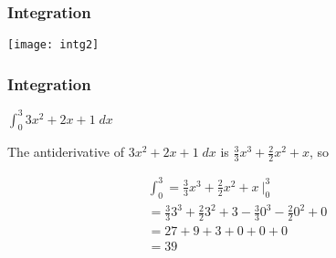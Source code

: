  \begin{frame}[fragile] \frametitle{Integration}

\begin{center}
\texttt{[image: intg2]}
\end{center}

\end{frame}

 \begin{frame}[fragile] \frametitle{Integration}


$\int_0^3 3x^2 + 2x + 1\;dx$

The antiderivative of $3x^2 + 2x + 1\;dx$ is $\frac{3}{3} x^3 + \frac{2}{2} x^2 + x$, so


\begin{align}
\int_0^3= \frac{3}{3} x^3 + \frac{2}{2} x^2 + x\ \big|_0^3\\
= \frac{3}{3} 3^3 + \frac{2}{2} 3^2 + 3 - \frac{3}{3} 0^3 - \frac{2}{2} 0^2 + 0\\
= 27 + 9 + 3 + 0 + 0 + 0\\
= 39
\end{align}



\end{frame}